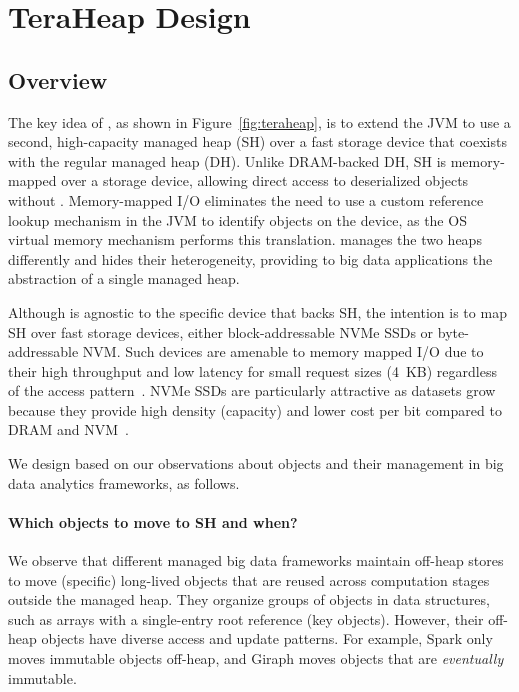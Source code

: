 \section{TeraHeap Design}
\subsection{Overview}
\label{sec:over}

The key idea of \teraheapName{}, as shown in Figure~\ref{fig:teraheap}, is to
extend the JVM to use a second, high-capacity managed heap (SH) over a
fast storage device that coexists with the regular managed heap (DH).
Unlike DRAM-backed DH, SH is memory-mapped over a storage device,
allowing direct access to deserialized objects without \teraheapSD.
Memory-mapped I/O eliminates the need to use a custom reference lookup
mechanism in the JVM to identify objects on the device, as the OS
virtual memory mechanism performs this translation.
\teraheapName{} manages the two heaps differently and hides their
heterogeneity, providing to big data applications the abstraction of a
single managed heap.

Although \teraheapName{} is agnostic to the specific device that backs SH, the
intention is to map SH over fast storage devices, either
block-addressable NVMe SSDs or byte-addressable NVM. Such devices are
amenable to memory mapped I/O due to their high throughput and low
latency for small request sizes (\SI{4}{KB}) regardless of the access
pattern~\cite{apapag:fmap}. NVMe SSDs are particularly attractive as
datasets grow because they provide high density (capacity) and lower
cost per bit compared to DRAM and NVM~\cite{weiner:tmo}.

We design \teraheapName{} based on our observations about objects and their
management in big data analytics frameworks, as follows.

\paragraph{\textbf{Which objects to move to SH and when?}}

We observe that different managed big data frameworks maintain off-heap stores
to move (specific) long-lived objects that are reused across computation stages
outside the managed heap. They organize groups of objects in data structures,
such as arrays with a single-entry root reference (key objects). However, their
off-heap objects have diverse access and update patterns. For example, Spark
only moves immutable objects off-heap, and Giraph moves objects that are
\emph{eventually} immutable.

